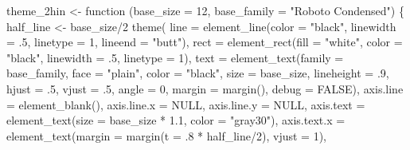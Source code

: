 \documentclass[
  letterpaper,
  DIV=11,
  numbers=noendperiod]{scrreprt}
\newenvironment{Shaded}{\begin{snugshade}}{\end{snugshade}}
\newcommand{\AttributeTok}[1]{\textcolor[rgb]{0.40,0.45,0.13}{#1}}
\newcommand{\ConstantTok}[1]{\textcolor[rgb]{0.56,0.35,0.01}{#1}}
\newcommand{\ControlFlowTok}[1]{\textcolor[rgb]{0.00,0.23,0.31}{#1}}
\newcommand{\DecValTok}[1]{\textcolor[rgb]{0.68,0.00,0.00}{#1}}
\newcommand{\FloatTok}[1]{\textcolor[rgb]{0.68,0.00,0.00}{#1}}
\newcommand{\FunctionTok}[1]{\textcolor[rgb]{0.28,0.35,0.67}{#1}}
\newcommand{\NormalTok}[1]{\textcolor[rgb]{0.00,0.23,0.31}{#1}}
\newcommand{\OtherTok}[1]{\textcolor[rgb]{0.00,0.23,0.31}{#1}}
\newcommand{\SpecialCharTok}[1]{\textcolor[rgb]{0.37,0.37,0.37}{#1}}
\newcommand{\StringTok}[1]{\textcolor[rgb]{0.13,0.47,0.30}{#1}}
\begin{document}
\begin{Shaded}
\begin{Highlighting}[]
\NormalTok{theme\_2hin }\OtherTok{\textless{}{-}} \ControlFlowTok{function}\NormalTok{ (}\AttributeTok{base\_size =} \DecValTok{12}\NormalTok{, }\AttributeTok{base\_family =} \StringTok{"Roboto Condensed"}\NormalTok{) \{}
\NormalTok{  half\_line }\OtherTok{\textless{}{-}}\NormalTok{ base\_size}\SpecialCharTok{/}\DecValTok{2}
  \FunctionTok{theme}\NormalTok{(}
    \AttributeTok{line =} \FunctionTok{element\_line}\NormalTok{(}\AttributeTok{color =} \StringTok{"black"}\NormalTok{, }\AttributeTok{linewidth =}\NormalTok{ .}\DecValTok{5}\NormalTok{,}
                        \AttributeTok{linetype =} \DecValTok{1}\NormalTok{, }\AttributeTok{lineend =} \StringTok{"butt"}\NormalTok{),}
    \AttributeTok{rect =} \FunctionTok{element\_rect}\NormalTok{(}\AttributeTok{fill =} \StringTok{"white"}\NormalTok{, }\AttributeTok{color =} \StringTok{"black"}\NormalTok{,}
                        \AttributeTok{linewidth =}\NormalTok{ .}\DecValTok{5}\NormalTok{, }\AttributeTok{linetype =} \DecValTok{1}\NormalTok{),}
    \AttributeTok{text =} \FunctionTok{element\_text}\NormalTok{(}\AttributeTok{family =}\NormalTok{ base\_family, }\AttributeTok{face =} \StringTok{"plain"}\NormalTok{,}
                        \AttributeTok{color =} \StringTok{"black"}\NormalTok{, }\AttributeTok{size =}\NormalTok{ base\_size,}
                        \AttributeTok{lineheight =}\NormalTok{ .}\DecValTok{9}\NormalTok{, }\AttributeTok{hjust =}\NormalTok{ .}\DecValTok{5}\NormalTok{, }\AttributeTok{vjust =}\NormalTok{ .}\DecValTok{5}\NormalTok{,}
                        \AttributeTok{angle =} \DecValTok{0}\NormalTok{, }\AttributeTok{margin =} \FunctionTok{margin}\NormalTok{(), }\AttributeTok{debug =} \ConstantTok{FALSE}\NormalTok{),}
    \AttributeTok{axis.line =} \FunctionTok{element\_blank}\NormalTok{(),}
    \AttributeTok{axis.line.x =} \ConstantTok{NULL}\NormalTok{,}
    \AttributeTok{axis.line.y =} \ConstantTok{NULL}\NormalTok{,}
    \AttributeTok{axis.text =} \FunctionTok{element\_text}\NormalTok{(}\AttributeTok{size =}\NormalTok{ base\_size }\SpecialCharTok{*} \FloatTok{1.1}\NormalTok{, }\AttributeTok{color =} \StringTok{"gray30"}\NormalTok{),}
    \AttributeTok{axis.text.x =} \FunctionTok{element\_text}\NormalTok{(}\AttributeTok{margin =} \FunctionTok{margin}\NormalTok{(}\AttributeTok{t =}\NormalTok{ .}\DecValTok{8} \SpecialCharTok{*}\NormalTok{ half\_line}\SpecialCharTok{/}\DecValTok{2}\NormalTok{),}
                               \AttributeTok{vjust =} \DecValTok{1}\NormalTok{),}

\end{Highlighting}
\end{Shaded}
\end{document}
